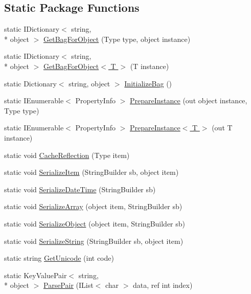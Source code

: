 \subsection*{Static Package Functions}
\begin{DoxyCompactItemize}
\item 
static I\-Dictionary$<$ string, \\*
object $>$ \hyperlink{a00060_a3589b9943dbb8872cd4030d4b9ff1a7a}{Get\-Bag\-For\-Object} (Type type, object instance)
\item 
static I\-Dictionary$<$ string, \\*
object $>$ \hyperlink{a00060_a9ce835f1af37bfb8f65176a0d3185d69}{Get\-Bag\-For\-Object$<$ T $>$} (T instance)
\item 
static Dictionary$<$ string, object $>$ \hyperlink{a00060_a9f62c2e79312364d7161b13a64b89c8e}{Initialize\-Bag} ()
\item 
static I\-Enumerable$<$ Property\-Info $>$ \hyperlink{a00060_ab61372226682d7b1d17f54345dfd17b5}{Prepare\-Instance} (out object instance, Type type)
\item 
static I\-Enumerable$<$ Property\-Info $>$ \hyperlink{a00060_a48baaa0a217d05b48e049a4c5f2784a9}{Prepare\-Instance$<$ T $>$} (out T instance)
\item 
static void \hyperlink{a00060_a1bb8d04c0c686da8bf81c0b273cc0591}{Cache\-Reflection} (Type item)
\item 
static void \hyperlink{a00060_a1ce11382c35fcbc0902e73deec3e617b}{Serialize\-Item} (String\-Builder sb, object item)
\item 
static void \hyperlink{a00060_a6874a321c86a87ddeafb25e1f5b37a42}{Serialize\-Date\-Time} (String\-Builder sb)
\item 
static void \hyperlink{a00060_a38298480de46941b764cbbae3ec00ac0}{Serialize\-Array} (object item, String\-Builder sb)
\item 
static void \hyperlink{a00060_a2a63df270c38b1c9ce7de54b268cdc4f}{Serialize\-Object} (object item, String\-Builder sb)
\item 
static void \hyperlink{a00060_a9322c1bf740844d26a732c091004063f}{Serialize\-String} (String\-Builder sb, object item)
\item 
static string \hyperlink{a00060_a03595e6253700fbdb86440704e1f2e66}{Get\-Unicode} (int code)
\item 
static Key\-Value\-Pair$<$ string, \\*
object $>$ \hyperlink{a00060_a59a67256e67e7a4edd4c9905ecd1aec8}{Parse\-Pair} (I\-List$<$ char $>$ data, ref int index)

\end{DoxyCompactItemize}
